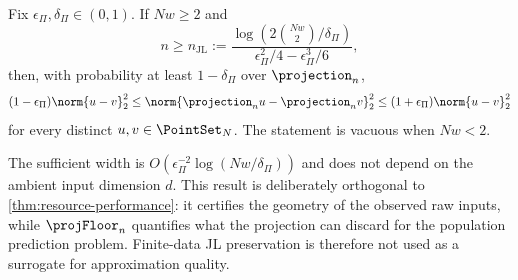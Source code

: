 \begin{proposition}
\label{prop:finite-data-jl}
Fix $\epsilon_\Pi,\delta_\Pi\in(0,1)$.  If $Nw\geq2$ and
\begin{equation}
    n\geq n_{\mathrm{JL}}
    :=\frac{\log\!\left(2\binom{Nw}{2}/\delta_\Pi\right)}
      {\epsilon_\Pi^2/4-\epsilon_\Pi^3/6},
    \label{eq:joint-jl-width-rule}
\end{equation}
then, with probability at least $1-\delta_\Pi$ over $\projection_n$,
\begin{equation}
    (1-\epsilon_\Pi)\norm{u-v}_2^2
    \leq\norm{\projection_nu-\projection_nv}_2^2
    \leq(1+\epsilon_\Pi)\norm{u-v}_2^2
    \label{eq:joint-jl-geometry}
\end{equation}
for every distinct $u,v\in\PointSet_N$.  The statement is vacuous when
$Nw<2$.
\end{proposition}

The sufficient width is
$O(\epsilon_\Pi^{-2}\log(Nw/\delta_\Pi))$ and does not depend on the ambient
input dimension $d$.  This result is deliberately orthogonal to
\cref{thm:resource-performance}: it certifies the geometry of the observed raw
inputs, while $\projFloor_n$ quantifies what the projection can discard for the
population prediction problem.  Finite-data JL preservation is therefore not
used as a surrogate for approximation quality.
